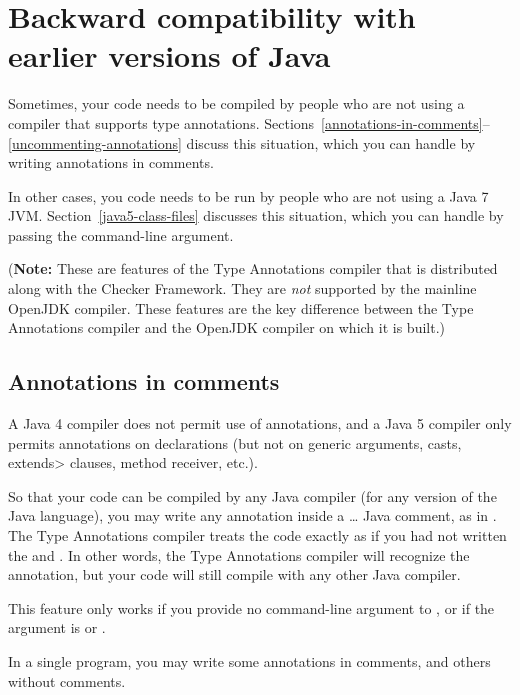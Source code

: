 \section{Backward compatibility with earlier versions of Java\label{backward-compatibility}}

Sometimes, your code needs to be compiled by people who are not using a
compiler that supports type annotations.
Sections~\ref{annotations-in-comments}--\ref{uncommenting-annotations}
discuss this situation, which you can handle by writing annotations in
comments.

In other cases, you code needs to be run by people who are not using a Java
7 JVM\@.  Section~\ref{java5-class-files} discusses this situation, which
you can handle by passing the  command-line argument.

(\textbf{Note:} These are features of the Type Annotations compiler that is
distributed along with the Checker Framework.  They are \emph{not}
supported by the mainline OpenJDK compiler.  These features are the key
difference between the Type Annotations compiler and the OpenJDK compiler
on which it is built.)



\subsection{Annotations in comments\label{annotations-in-comments}}

A Java 4 compiler does not permit use of
annotations, and a Java 5 compiler only permits annotations on
declarations (but not on generic arguments, casts, \<extends> clauses, method receiver, etc.).

So that your code can be compiled by any Java compiler (for any version of
the Java language), you may write any annotation inside a
\code{/*}\ldots\code{*/} Java comment, as in .
The Type Annotations compiler treats the code exactly as if you had not written the
\code{/*} and \code{*/}.
In other words, the Type Annotations compiler will recognize the
annotation, but your code will still compile with any other Java compiler.

This feature only works if you provide no  command-line
argument to , or if the  argument is 
or .

In a single program, you may write some annotations in comments, and others
without comments.

